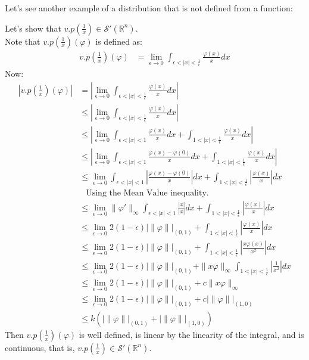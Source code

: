 Let’s see another example of a distribution that is not defined from a function:
\begin{example}{}
  Let’s show that $v.p \left(\frac{1}{x}\right)\in\mathcal{S}'(\mathbb{R}^n)$.\\
  Note that $v.p\left(\frac{1}{x}\right)(\varphi)$ is defined as:
  \begin{align*}
    v.p\left(\frac{1}{x}\right)(\varphi)&=\lim_{\epsilon\rightarrow 0}\int_{\epsilon<|x|<\frac{1}{\epsilon}}\frac{\varphi(x)}{x}dx
  \end{align*}
  Now:
  \begin{align*}
    \left|v.p\left(\frac{1}{x}\right)(\varphi)\right|&=\left|\lim_{\epsilon\rightarrow 0}\int_{\epsilon<|x|<\frac{1}{\epsilon}}\frac{\varphi(x)}{x}dx \right|\\
    &\leq\left|\lim_{\epsilon\rightarrow 0}\int_{\epsilon<|x|<\frac{1}{\epsilon}}\frac{\varphi(x)}{x} dx\right|\\
    &\leq\left|\lim_{\epsilon\rightarrow 0} \int_{\epsilon<|x|<1}\frac{\varphi(x)}{x}dx+\int_{1<|x|<\frac{1}{\epsilon}}\frac{\varphi(x)}{x}dx\right|\\
    &\leq\left|\lim_{\epsilon\rightarrow 0} \int_{\epsilon<|x|<1}\frac{\varphi(x)-\varphi(0)}{x}dx+\int_{1<|x|<\frac{1}{\epsilon}}\frac{\varphi(x)}{x}dx\right|\\
    &\leq\lim_{\epsilon\rightarrow 0} \int_{\epsilon<|x|<1}\left|\frac{\varphi(x)-\varphi(0)}{x}\right|dx+\int_{1<|x|<\frac{1}{\epsilon}}\left|\frac{\varphi(x)}{x}\right|dx\\
    &\phantom{\leq}\text{Using the Mean Value inequality.}\\
    &\leq\lim_{\epsilon\rightarrow 0} \|\varphi'\|_{\infty}\int_{\epsilon<|x|<1}\frac{|x|}{|x|}dx+\int_{1<|x|<\frac{1}{\epsilon}}\left|\frac{\varphi(x)}{x}\right|dx\\
    &\leq\lim_{\epsilon\rightarrow 0} 2(1-\epsilon)|\|\varphi\||_{(0,1)}+\int_{1<|x|<\frac{1}{\epsilon}}\left|\frac{\varphi(x)}{x}\right|dx\\
    &\leq\lim_{\epsilon\rightarrow 0} 2(1-\epsilon)|\|\varphi\||_{(0,1)}+\int_{1<|x|<\frac{1}{\epsilon}}\left|\frac{x\varphi(x)}{x^2}\right|dx\\
    &\leq\lim_{\epsilon\rightarrow 0} 2(1-\epsilon)|\|\varphi\||_{(0,1)}+\|x\varphi\|_{\infty}\int_{1<|x|<\frac{1}{\epsilon}}\left|\frac{1}{x^2}\right|dx\\
    &\leq \lim_{\epsilon\rightarrow 0}2(1-\epsilon)|\|\varphi\||_{(0,1)}+c\|x\varphi\|_{\infty}\\
    &\leq \lim_{\epsilon\rightarrow 0}2(1-\epsilon)|\|\varphi\||_{(0,1)}+c|\|\varphi\||_{(1,0)}\\
    &\leq k(|\|\varphi\||_{(0,1)}+|\|\varphi\||_{(1,0)})
  \end{align*}
  Then $v.p\left(\frac{1}{x}\right)(\varphi)$ is well defined, is linear by the linearity of the integral, and is continuous, that is, $v.p\left(\frac{1}{x}\right)\in\mathcal{S}'(\mathbb{R}^n)$.
\end{example}
